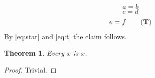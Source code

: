 \documentclass{article}
\newtheorem{theorem}{Theorem}
\begin{document}
\begin{equation}\label{eq:star}
  a = b \tag{$\ast$}
\end{equation}
\begin{equation}
  c = d \tag*{A$'$}
\end{equation}
\begin{equation}\label{eq:t}
  e = f \tag{\textbf{T}}
\end{equation}
By \eqref{eq:star} and \eqref{eq:t} the claim follows.

\begin{theorem}\label{thm:a}
Every $x$ is $x$.
\end{theorem}

\begin{proof}
Trivial.
\end{proof}
\end{document}
